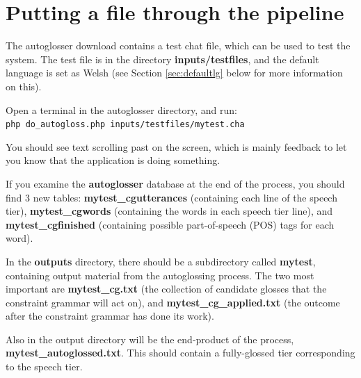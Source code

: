 \documentclass[a4paper,10pt]{article}
\begin{document}
\section{Putting a file through the pipeline}
\label{sec:pipeline}

The autoglosser download contains a test chat file, which can be used to test the system.  The test file is in the directory \textbf{inputs/testfiles}, and the default language is set as Welsh (see Section \ref{sec:defaultlg} below for more information on this).

Open a terminal in the autoglosser directory, and run:\\
\verb|php do_autogloss.php inputs/testfiles/mytest.cha|\

You should see text scrolling past on the screen, which is mainly feedback to let you know that the application is doing something.

If you examine the \textbf{autoglosser} database at the end of the process, you should find 3 new tables: \textbf{mytest\_cgutterances} (containing each line of the speech tier), \textbf{mytest\_cgwords} (containing the words in each speech tier line), and \textbf{mytest\_cgfinished} (containing possible part-of-speech (POS) tags for each word).  

In the \textbf{outputs} directory, there should be a subdirectory called \textbf{mytest}, containing output material from the autoglossing process.  The two most important are \textbf{mytest\_cg.txt} (the collection of candidate glosses that the constraint grammar will act on), and \textbf{mytest\_cg\_applied.txt} (the outcome after the constraint grammar has done its work).  

Also in the output directory will be the end-product of the process, \textbf{mytest\_autoglossed.txt}.  This should contain a fully-glossed tier corresponding to the speech tier.
\end{document}
